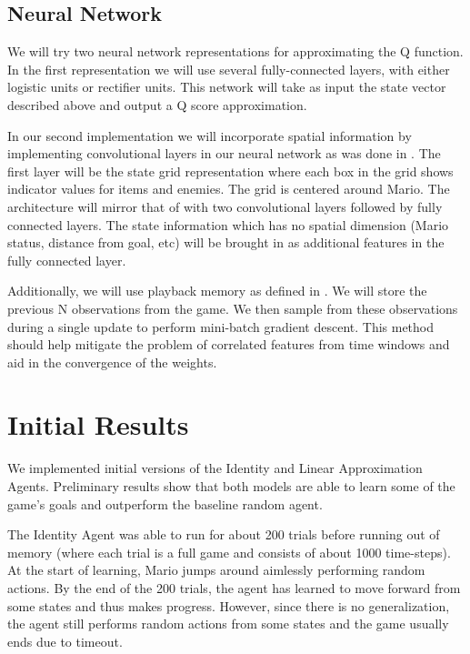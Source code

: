 \documentclass[12pt]{article}
\begin{document}
\subsection{Neural Network}

We will try two neural network representations for approximating the Q function. In the first representation we will use several fully-connected layers, with either logistic units or rectifier units. This network will take as input the state vector described above and output a Q score approximation.

In our second implementation we will incorporate spatial information by implementing convolutional layers in our neural network as was done in \cite{mnih}. The first layer will be the state grid representation where each box in the grid shows indicator values for items and enemies. The grid is centered around Mario. The architecture will mirror that of \cite{mnih} with two convolutional layers followed by fully connected layers. The state information which has no spatial dimension (Mario status, distance from goal, etc) will be brought in as additional features in the fully connected layer.

Additionally, we will use playback memory as defined in \cite{mnih}. We will store the previous N observations from the game. We then sample from these observations during a single update to perform mini-batch gradient descent. This method should help mitigate the problem of correlated features from time windows and aid in the convergence of the weights.

\section{Initial Results}

We implemented initial versions of the Identity and Linear Approximation Agents. Preliminary results show that both models are able to learn some of the game's goals and outperform the baseline random agent.

The Identity Agent was able to run for about 200 trials before running out of memory (where each trial is a full game and consists of about 1000 time-steps). At the start of learning, Mario jumps around aimlessly performing random actions. By the end of the 200 trials, the agent has learned to move forward from some states and thus makes progress. However, since there is no generalization, the agent still performs random actions from some states and the game usually ends due to timeout. 
\end{document}
